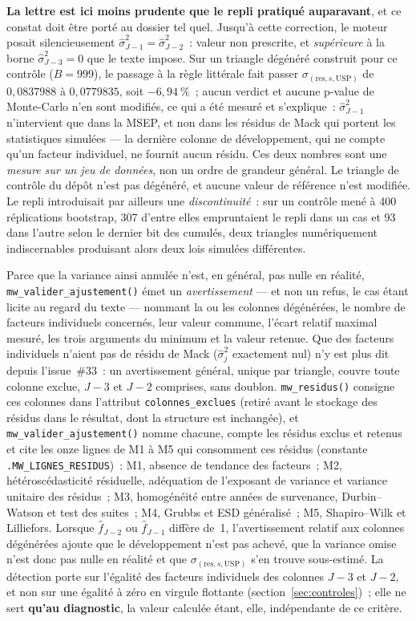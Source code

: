 \documentclass[a4paper,11pt]{article}
\newcommand{\code}[1]{\texttt{\small #1}}
\begin{document}
\textbf{La lettre est ici moins prudente que le repli pratiqué auparavant}, et
ce constat doit être porté au dossier tel quel. Jusqu'à cette correction, le
moteur posait silencieusement $\hat\sigma_{J-1}^2 = \hat\sigma_{J-2}^2$~: valeur
non prescrite, et \emph{supérieure} à la borne $\hat\sigma_{J-3}^2 = 0$ que le
texte impose. Sur un triangle dégénéré construit pour ce contrôle ($B = 999$),
le passage à la règle littérale fait passer
$\sigma_{(\text{res},s,\mathrm{USP})}$ de $0{,}0837988$ à $0{,}0779835$, soit
$-6{,}94~\%$~; aucun verdict et aucune p-value de Monte-Carlo n'en sont
modifiés, ce qui a été mesuré et s'explique~: $\hat\sigma_{J-1}^2$ n'intervient
que dans la MSEP, et non dans les résidus de Mack qui portent les statistiques
simulées --- la dernière colonne de développement, qui ne compte qu'un facteur
individuel, ne fournit aucun résidu. Ces deux
nombres sont une \emph{mesure sur un jeu de données}, non un ordre de grandeur
général. Le triangle de contrôle du dépôt n'est pas dégénéré, et aucune valeur
de référence n'est modifiée. Le repli introduisait par ailleurs une
\emph{discontinuité}~: sur un contrôle mené à 400 réplications bootstrap, 307
d'entre elles empruntaient le repli dans un cas et 93 dans l'autre selon le
dernier bit des cumulés, deux triangles numériquement indiscernables produisant
alors deux lois simulées différentes.

Parce que la variance ainsi annulée n'est, en général, pas nulle en réalité,
\code{mw\_valider\_ajustement()} émet un \emph{avertissement} --- et non un
refus, le cas étant licite au regard du texte --- nommant la ou les colonnes
dégénérées, le nombre de facteurs individuels concernés, leur valeur commune,
l'écart relatif maximal mesuré, les trois arguments du minimum et la valeur
retenue. Que des facteurs individuels n'aient pas de résidu de Mack
($\hat\sigma_j^2$ exactement nul) n'y est plus dit depuis l'issue~\#33~: un avertissement
général, unique par triangle, couvre toute colonne exclue, $J-3$ et $J-2$ comprises, sans
doublon. \code{mw\_residus()} consigne ces colonnes dans l'attribut \code{colonnes\_exclues}
(retiré avant le stockage des résidus dans le résultat, dont la structure est inchangée), et
\code{mw\_valider\_ajustement()} nomme chacune, compte les résidus exclus et retenus et cite les
onze lignes de M1 à M5 qui consomment ces résidus (constante \code{.MW\_LIGNES\_RESIDUS})~: M1, absence de
tendance des facteurs~; M2, hétéroscédasticité résiduelle, adéquation de
l'exposant de variance et variance unitaire des résidus~; M3, homogénéité entre
années de survenance, Durbin--Watson et test des suites~; M4, Grubbs et ESD
généralisé~; M5, Shapiro--Wilk et Lilliefors. Lorsque $\hat f_{J-2}$ ou
$\hat f_{J-1}$ diffère de~1, l'avertissement relatif aux colonnes dégénérées ajoute que le
développement n'est pas achevé,
que la variance omise n'est donc pas nulle en réalité et que
$\sigma_{(\text{res},s,\mathrm{USP})}$ s'en trouve sous-estimé. La détection
porte sur l'égalité des facteurs individuels des colonnes $J-3$ et $J-2$, et
non sur une égalité à zéro en virgule flottante (section~\ref{sec:controles})~;
elle ne sert \textbf{qu'au diagnostic}, la valeur calculée étant, elle,
indépendante de ce critère.
\end{document}
